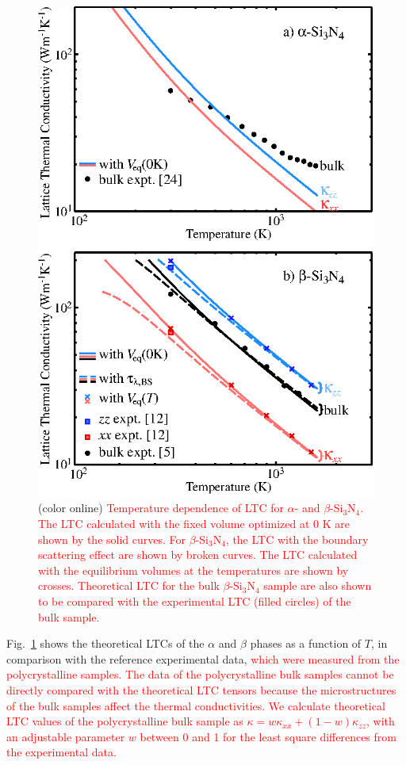 \documentclass[twocolumn,amsmath,amssymb,a4paper,prb,superscriptaddress,floatfix]{revtex4-1}
\begin{document}
\begin{figure}[ht]
 \begin{center}
  \includegraphics[width=0.90\linewidth]{Fig1.eps} \caption{(color
  online) \textcolor{red}{Temperature dependence of LTC for $\alpha$-
  and $\beta$-Si$_3$N$_4$. The LTC calculated with the fixed volume
  optimized at 0 K are shown by the solid curves. For
  $\beta$-Si$_3$N$_4$, the LTC with the boundary scattering effect are
  shown by broken curves. The LTC calculated with the equilibrium
  volumes at the temperatures are shown by crosses. Theoretical LTC for
  the bulk $\beta$-Si$_3$N$_4$ sample are also shown to be compared with
  the experimental LTC (filled circles) of the bulk sample.}
  \label{fig:Fig1_338} }
 \end{center}
\end{figure}

Fig.~\ref{fig:Fig1_338} shows the theoretical LTCs of the $\alpha$ and
$\beta$ phases as a function of $T$, in comparison with the reference
experimental data,
%
\textcolor{red}{which were measured from the polycrystalline
samples. The data of the polycrystalline bulk samples cannot be directly
compared with the theoretical LTC tensors because the microstructures of
the bulk samples affect the thermal conductivities. We calculate
theoretical LTC values of the polycrystalline bulk sample as $\kappa = w
\kappa_{xx} + (1-w) \kappa_{zz}$, with an adjustable parameter $w$
between 0 and 1 for the least square differences from the experimental
data.}
\end{document}

